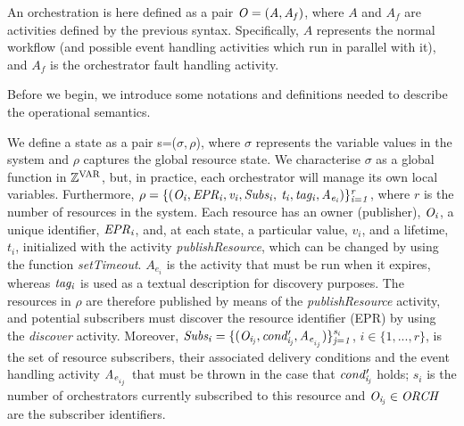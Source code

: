 An orchestration is here defined as a pair ${\it O= (A,A_f)}$, where $A$ and $A_f$ are activities defined by the previous syntax. Specifically, $A$ represents the normal workflow (and possible event handling activities which run in parallel with it), and $A_f$ is the orchestrator fault handling activity.

Before we begin, we introduce some notations and definitions needed to describe the operational semantics.
\begin{definition}[State] %
We define a state as a pair s=($\sigma, \rho$), where $\sigma$ represents the variable values in the system and $\rho$ captures the global resource state. We characterise $\sigma$ as a global function in ${\it \mathbb{Z}^\textrm{VAR}}$, but, in practice, each orchestrator will manage its own local variables. Furthermore, $\it{ \rho=\{(O_i,EPR_i,v_i,Subs_i,}$ $\it{ t_i,tag_i,A_{e{_i}})\}_{i=1}^r}$, where $r$ is the number of resources in the system. Each resource has an owner (publisher), ${\it O_i}$, a unique identifier, ${\it EPR_i}$, and, at each state, a particular value, $v_i$, and a lifetime, $t_i$, initialized with the activity {\it publishResource}, which can be changed by using the function {\it setTimeout}. $A_{e{_i}}$ is the activity that must be run when it expires, whereas ${\it tag_i}$ is used as a textual description for discovery purposes. The resources in $\rho$ are therefore published by means of the {\em publishResource} activity, and potential subscribers must discover the resource identifier (EPR) by using the {\it discover} activity. %
Moreover, $\it{Subs_i=\{(O_{i_{j}},cond'_{i_{j}},A_{e{_{_i{_{_j}}}}})\}_{j=1}^{{s_i}}}$, $i \in \{1,...,r\}$, is the set of resource subscribers, their associated delivery conditions and the event handling activity ${\it A_{e{_{_i{_{_j}}}}}}$ that must be thrown in the case that ${\it cond'_{i_{j}}}$ holds; $s_i$ is the number of orchestrators currently subscribed to this resource and ${\it O_{i_{j}} \in ORCH}$ are the subscriber identifiers.
\end{definition}


